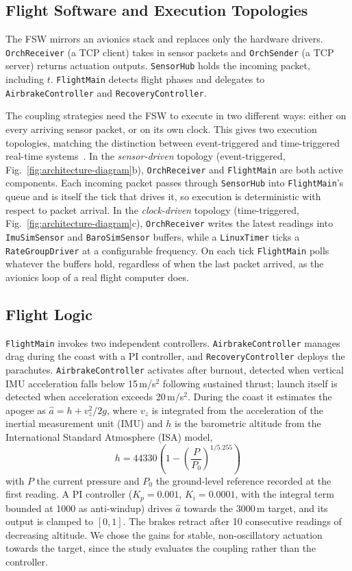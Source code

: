 \subsection{Flight Software and Execution Topologies}\label{s:fsw-arch}
The FSW mirrors an avionics stack and replaces only the hardware drivers. \texttt{OrchReceiver} (a TCP client) takes in sensor packets and \texttt{OrchSender} (a TCP server) returns actuation outputs. \texttt{SensorHub} holds the incoming packet, including $t$. \texttt{FlightMain} detects flight phases and delegates to \texttt{AirbrakeController} and \texttt{RecoveryController}.

The coupling strategies need the FSW to execute in two different ways: either on every arriving sensor packet, or on its own clock. This gives two execution topologies, matching the distinction between event-triggered and time-triggered real-time systems~\cite{scheler-time-trigger-event-trigger}. In the \emph{sensor-driven} topology (event-triggered, Fig.~\ref{fig:architecture-diagram}b), \texttt{OrchReceiver} and \texttt{FlightMain} are both active components. Each incoming packet passes through \texttt{SensorHub} into \texttt{FlightMain}'s queue and is itself the tick that drives it, so execution is deterministic with respect to packet arrival. In the \emph{clock-driven} topology (time-triggered, Fig.~\ref{fig:architecture-diagram}c), \texttt{OrchReceiver} writes the latest readings into \texttt{ImuSimSensor} and \texttt{BaroSimSensor} buffers, while a \texttt{LinuxTimer} ticks a \texttt{RateGroupDriver} at a configurable frequency. On each tick \texttt{FlightMain} polls whatever the buffers hold, regardless of when the last packet arrived, as the avionics loop of a real flight computer does.

\subsection{Flight Logic}\label{flight-logic}
\texttt{FlightMain} invokes two independent controllers. \texttt{AirbrakeController} manages drag during the coast with a PI controller, and \texttt{RecoveryController} deploys the parachutes. \texttt{AirbrakeController} activates after burnout, detected when vertical IMU acceleration falls below 15\,m/s$^2$ following sustained thrust; launch itself is detected when acceleration exceeds 20\,m/s$^2$. During the coast it estimates the apogee as $\hat{a} = h + v_z^2/2g$, where $v_z$ is integrated from the acceleration of the inertial measurement unit (IMU) and $h$ is the barometric altitude from the International Standard Atmosphere (ISA) model,
\begin{equation}
h = 44330\left(1-\left(\frac{P}{P_0}\right)^{1/5.255}\right)
\end{equation}
with $P$ the current pressure and $P_0$ the ground-level reference recorded at the first reading. A PI controller ($K_p=0.001$, $K_i=0.0001$, with the integral term bounded at 1000 as anti-windup) drives $\hat{a}$ towards the 3000\,m target, and its output is clamped to $[0,1]$. The brakes retract after 10 consecutive readings of decreasing altitude. We chose the gains for stable, non-oscillatory actuation towards the target, since the study evaluates the coupling rather than the controller.

